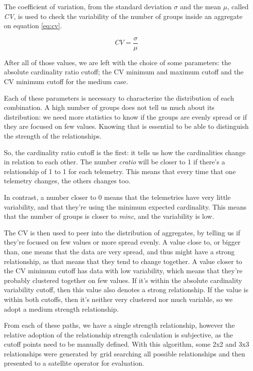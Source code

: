 The coefficient of variation, from the standard deviation \(\sigma\) and the mean \(\mu\), called \emph{CV}, is used to check the variability of the number of groups inside an aggregate on equation \ref{eq:cv}.

\begin{equation} \label{eq:cv}
    CV = \frac{\sigma}{\mu}
\end{equation}

After all of those values, we are left with the choice of some parameters: the absolute cardinality ratio cutoff; the CV minimum and maximum cutoff and the CV minimum cutoff for the medium case.

Each of these parameters is necessary to characterize the distribution of each combination.
A high number of groups does not tell us much about its distribution: we need more statistics to know if the groups are evenly spread or if they are focused on few values.
Knowing that is essential to be able to distinguish the strength of the relationships.

So, the cardinality ratio cutoff is the first: it tells us how the cardinalities change in relation to each other.
The number \emph{cratio} will be closer to 1 if there's a relationship of 1 to 1 for each telemetry. This means that every time that one telemetry changes, the others changes too.

In contrast, a number closer to 0 means that the telemetries have very little variability, and that they're using the minimum expected cardinality.
This means that the number of groups is closer to \emph{minc}, and the variability is low.

The CV is then used to peer into the distribution of aggregates, by telling us if they're focused on few values or more spread evenly.
A value close to, or bigger than, one means that the data are very spread, and thus might have a strong relationship, as that means that they tend to change together.
A value closer to the CV minimum cutoff has data with low variability, which means that they're probably clustered together on few values.
If it's within the absolute cardinality variability cutoff, then this value also denotes a strong relationship.
If the value is within both cutoffs, then it's neither very clustered nor much variable, so we adopt a medium strength relationship.

From each of these paths, we have a single strength relationship, however the relative adoption of the relationship strength calculation is subjective, as the cutoff points need to be manually defined.
With this algorithm, some 2x2 and 3x3 relationships were generated by grid searching all possible relationships and then presented to a satellite operator for evaluation.

